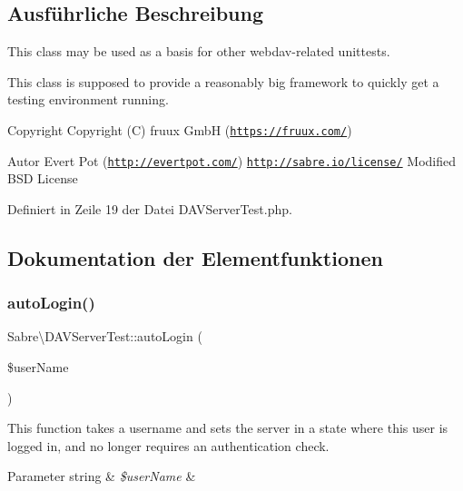 \subsection{Ausführliche Beschreibung}
This class may be used as a basis for other webdav-\/related unittests.

This class is supposed to provide a reasonably big framework to quickly get a testing environment running.

\begin{DoxyCopyright}{Copyright}
Copyright (C) fruux GmbH (\href{https://fruux.com/}{\tt https\+://fruux.\+com/}) 
\end{DoxyCopyright}
\begin{DoxyAuthor}{Autor}
Evert Pot (\href{http://evertpot.com/}{\tt http\+://evertpot.\+com/})  \href{http://sabre.io/license/}{\tt http\+://sabre.\+io/license/} Modified B\+SD License 
\end{DoxyAuthor}


Definiert in Zeile 19 der Datei D\+A\+V\+Server\+Test.\+php.



\subsection{Dokumentation der Elementfunktionen}
\mbox{\label{class_sabre_1_1_d_a_v_server_test_a288bc7a69291333bf536067840898937}} 
\subsubsection{\texorpdfstring{auto\+Login()}{autoLogin()}}
{\footnotesize\ttfamily Sabre\textbackslash{}\+D\+A\+V\+Server\+Test\+::auto\+Login (\begin{DoxyParamCaption}\item[{}]{\$user\+Name }\end{DoxyParamCaption})}

This function takes a username and sets the server in a state where this user is logged in, and no longer requires an authentication check.


\begin{DoxyParams}[1]{Parameter}
string & {\em \$user\+Name} & \\
\hline
\end{DoxyParams}


